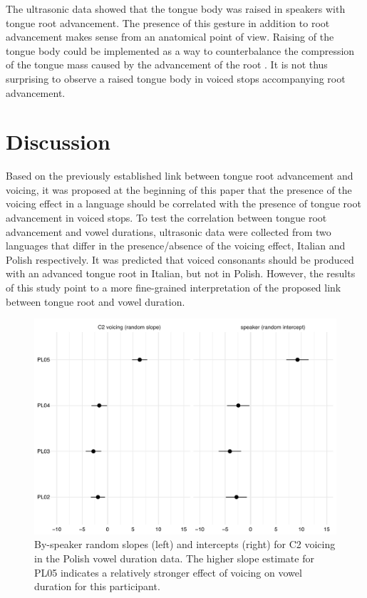 \documentclass[authoryear, twocolumn]{elsarticle}
\begin{document}
The ultrasonic data showed that the tongue body was raised in speakers
with tongue root advancement. The presence of this gesture in addition
to root advancement makes sense from an anatomical point of view.
Raising of the tongue body could be implemented as a way to
counterbalance the compression of the tongue mass caused by the
advancement of the root \citep{fulop1998}. It is not thus surprising to
observe a raised tongue body in voiced stops accompanying root
advancement.

\section{Discussion}\label{discussion}

\label{s:discussion}

Based on the previously established link between tongue root advancement
and voicing, it was proposed at the beginning of this paper that the
presence of the voicing effect in a language should be correlated with
the presence of tongue root advancement in voiced stops. To test the
correlation between tongue root advancement and vowel durations,
ultrasonic data were collected from two languages that differ in the
presence/absence of the voicing effect, Italian and Polish respectively.
It was predicted that voiced consonants should be produced with an
advanced tongue root in Italian, but not in Polish. However, the results
of this study point to a more fine-grained interpretation of the
proposed link between tongue root and vowel duration.

\begin{figure}
    \centering
    \includegraphics[height=.35\textwidth]{fig/polish-re.pdf}
    \caption{By-speaker random slopes (left) and intercepts (right) for C2 voicing in the Polish vowel duration data. The higher slope estimate for PL05 indicates a relatively stronger effect of voicing on vowel duration for this participant.}
    \label{f:polish-re}
\end{figure}
\end{document}
